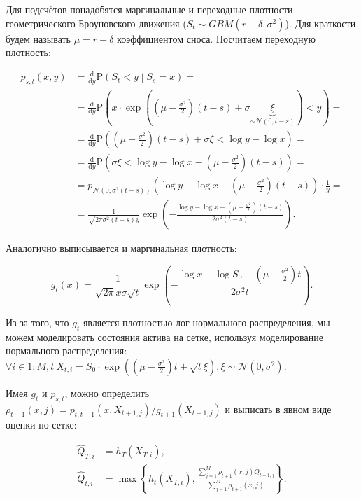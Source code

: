 \documentclass[specialist,
               substylefile = ../spbu.rtx,
               subf,href,colorlinks=true, 12pt]{disser}
\newcommand{\prob}[1]{\mathrm{P}\left(#1\right)}
\begin{document}
Для подсчётов понадобятся маргинальные и переходные плотности геометрического Броуновского движения ($S_t \sim GBM\left(r - \delta, \sigma^2\right)$). Для краткости будем называть $\mu = r - \delta$ коэффициентом сноса. Посчитаем переходную плотность:

\begin{align*}
    p_{s, t}\left(x, y\right) &= \frac{\mathrm d}{\mathrm dy} \prob{S_t < y \middle\vert S_s = x} = \\ 
    &= \frac{\mathrm d}{\mathrm dy} \prob{x\cdot\exp\left(\left(\mu - \frac{\sigma^2}{2}\right)\left(t - s\right) + \sigma\underbrace{\xi}_{\sim\mathcal N\left(0, t - s\right)}\right) < y} =  \\ 
    &= \frac{\mathrm d}{\mathrm dy} \prob{\left(\mu - \frac{\sigma^2}{2}\right)\left(t - s\right) + \sigma\xi < \log y - \log x} = \\ 
    &= \frac{\mathrm d}{\mathrm dy} \prob{\sigma\xi < {\log y - \log x - \left(\mu - \frac{\sigma^2}{2}\right)\left(t - s\right)}} = \\ 
    &= p_{\mathcal N\left(0, \sigma^2\left(t - s\right)\right)}\left(\log y - \log x - \left(\mu - \frac{\sigma^2}{2}\right)\left(t - s\right)\right)\cdot \frac{1}{y} = \\
    &= \frac{1}{\sqrt{2\pi\sigma^2\left(t - s\right)}y}\exp\left(-\frac{\log y - \log x - \left(\mu - \frac{\sigma^2}{2}\right)\left(t - s\right)}{2\sigma^2\left(t-s\right)}\right).
\end{align*}

Аналогично выписывается и маргинальная плотность:

$$g_t\left(x\right) = \frac{1}{\sqrt{2\pi}x\sigma\sqrt{t}}\exp\left(-\frac{\log x - \log S_0 - \left(\mu - \frac{\sigma^2}{2}\right)t}{2\sigma^2t}\right).$$

Из-за того, что $g_t$ является плотностью лог-нормального распределения, мы можем моделировать состояния актива на сетке, используя моделирование нормального распределения: $\forall i \in 1\mathbin : M, t\: X_{t, i} = S_0\cdot\exp\left(\left(\mu-\frac{\sigma^2}{2}\right)t + \sqrt t \xi\right), \xi\sim\mathcal N\left(0, \sigma^2\right)$. 

Имея $g_t$ и $p_{s, t}$, можно определить $\rho_{t+1}\left(x, j\right) = p_{t, t+1}\left(x, X_{t+1, j}\right) / g_{t+1}\left(X_{t+1, j}\right)$ и выписать в явном виде оценки по сетке:

\[\begin{aligned}
\hat Q _{T, i} &= h_T\left( X_{T, i}\right), \\
\hat Q _{t, i} &= \max\left\lbrace h_t\left( X_{T, i}\right), \frac{\sum_{j=1}^M \rho_{t+1}\left(x, j\right) \hat Q_{t+1, j}}{\sum_{j=1}^M \rho_{t+1}\left(x, j\right)}\right\rbrace.\end{aligned}\]
\end{document}
